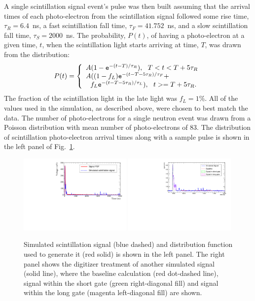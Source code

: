 \documentclass[review]{elsarticle}
\begin{document}
A single scintillation signal event's pulse was then built assuming
that the arrival times of each photo-electron from the scintillation
signal followed some rise time, $\tau_R=6.4$~ns, a fast scintillation
fall time, $\tau_F=41.752$~ns, and a slow scintillation fall time,
$\tau_S=2000$~ns.  The probability, $P(t)$, of having a photo-electron
at a given time, $t$, when the scintillation light starts arriving at
time, $T$, was drawn from the distribution:
\begin{equation}
  P(t) = \left\{
    \begin{array}{l}
      A ( 1 - {\tt e}^{-(t-T)/\tau_R } ),\ \ T<t<T+5\tau_R \\
      A ( (1-f_L) {\tt e}^{ -(t-T-5\tau_R)/\tau_F } +   \\
      \ \ f_L {\tt e}^{ -(t-T-5\tau_R)/\tau_L } ),\ \  t>=T+5\tau_R.
    \end{array}
    \right.
\end{equation}
The fraction of the scintillation light in the late light was
$f_L=1$\%.  All of the values used in the simulation, as described
above, were chosen to best match the data.  The number of
photo-electrons for a single neutron event was drawn from a Poisson
distribution with mean number of photo-electrons of 83.  The
distribution of scintillation photo-electron arrival times along with
a sample pulse is shown in the left panel of Fig.~\ref{fig:signalpdf}.

\begin{figure}[!htpb]
\centering
\includegraphics[width=0.49\textwidth]{figures/signalpulse.pdf}
\includegraphics[width=0.49\textwidth]{figures/digisimexample.pdf}
\caption{ Simulated scintillation signal (blue dashed) and
  distribution function used to generate it (red solid) is shown in
  the left panel.  The right panel shows the digitizer treatment of
  another simulated signal (solid line), where the baseline
  calculation (red dot-dashed line), signal within the short gate
  (green right-diagonal fill) and signal within the long gate (magenta
  left-diagonal fill) are shown.}\label{fig:signalpdf}
\end{figure}
\end{document}
